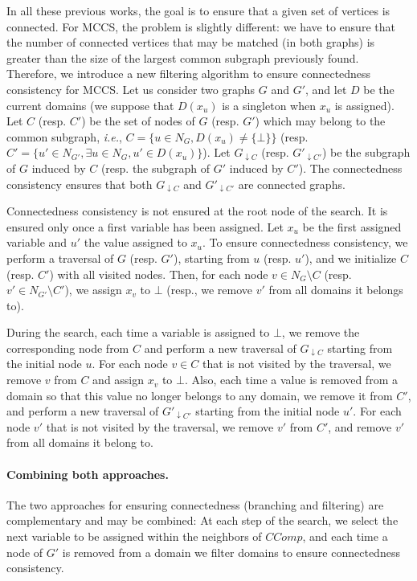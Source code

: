\documentclass{llncs}
\begin{document}
In all these previous works, the goal is to ensure that a given set of vertices is connected. For
MCCS, the problem is slightly different: we have to ensure that the number of connected vertices
that may be matched (in both graphs) is greater than the size of the largest common subgraph
previously found. Therefore, we introduce a new filtering algorithm to ensure connectedness
consistency for MCCS.  Let us consider two graphs $G$ and $G'$, and let $D$ be the current domains
(we suppose that $D(x_u)$ is a singleton when $x_u$ is assigned). Let $C$ (resp. $C'$) be the set of
nodes of $G$ (resp. $G'$) which may belong to the common subgraph, {\em i.e.}, $C=\{ u\in N_{G},
D(x_u)\neq\{\bot\}\}$ (resp. $C' = \{u'\in N_{G'}, \exists u\in N_G, u'\in D(x_u)\}$). Let
$G_{\downarrow C}$ (resp. $G'_{\downarrow C'}$) be the subgraph of $G$ induced by $C$ (resp. the
subgraph of $G'$ induced by $C'$).  The connectedness consistency ensures that both $G_{\downarrow
C}$ and $G'_{\downarrow C'}$ are connected graphs.

Connectedness consistency is not ensured at the root node of the search. It is ensured only once a
first variable has been assigned. Let $x_u$ be the first assigned variable and $u'$ the value
assigned to $x_u$. To ensure connectedness consistency, we perform a traversal of $G$ (resp. $G'$),
starting from $u$ (resp. $u'$), and we initialize $C$ (resp. $C'$) with all visited nodes. Then, for
each node $v\in N_G\setminus C$ (resp. $v'\in N_{G'}\setminus C'$), we assign $x_v$ to $\bot$
(resp., we remove $v'$ from all domains it belongs to).

During the search, each time a variable is assigned to $\bot$, we remove the corresponding node from
$C$ and perform a new traversal of $G_{\downarrow C}$ starting from the initial node $u$. For each
node $v\in C$ that is not visited by the traversal, we remove $v$ from $C$ and assign $x_v$ to
$\bot$. Also, each time a value is removed from a domain so that this value no longer belongs to any
domain, we remove it from $C'$, and perform a new traversal of $G'_{\downarrow C'}$ starting from
the initial node $u'$. For each node $v'$ that is not visited by the traversal, we remove $v'$ from
$C'$, and remove $v'$ from all domains it belong to.

\paragraph{Combining both approaches.} The two approaches for ensuring connectedness (branching and
filtering) are complementary and may be combined: At each step of the search, we select the next
variable to be assigned within the neighbors of $CComp$, and each time a node of $G'$ is removed
from a domain we filter domains to ensure connectedness consistency.
\end{document}
